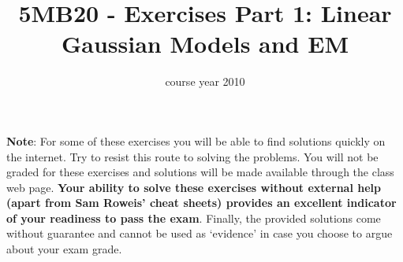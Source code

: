 \documentclass[a4paper]{article}
\title{5MB20 - Exercises Part 1: Linear Gaussian Models and EM}
\date{course year 2010}
\begin{document}
\maketitle

\textbf{Note}: For some of these exercises you will be able to find solutions quickly on the internet. Try to resist this route to solving the problems. You will not be graded for these exercises and solutions will be made available through the class web page. \textbf{Your ability to solve these exercises without external help (apart from Sam Roweis' cheat sheets) provides an excellent indicator of your readiness to pass the exam}. Finally, the provided solutions come without guarantee and cannot be used as `evidence' in case you choose to argue about your exam grade.

\bigskip
\end{document}
